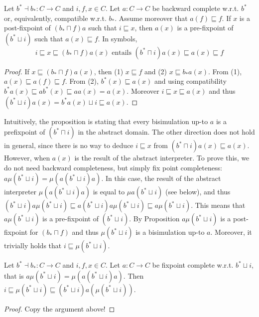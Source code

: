 \documentclass{llncs}
\begin{document}
\begin{proposition}
Let $b^* \dashv b_* \colon C \to C$ and $i,f,x\in C$. Let $a\colon C\to C$ be backward complete w.r.t. $b^*$ or, equivalently, compatible w.r.t. $b_*$. Assume moreover that $a(f)\sqsubseteq f$. 
%
If $x$ is a post-fixpoint of $(b_*\sqcap f)a$ such that $i\sqsubseteq x$,
then $a(x)$ is a pre-fixpoint of $(b^*\sqcup i)$ such that $a(x)\sqsubseteq f$.
In symbols, 
\begin{equation}
i \sqsubseteq x \sqsubseteq (b_*\sqcap f)a(x)
\text{ entails }
(b^*\sqcap i)a(x)\sqsubseteq a(x)\sqsubseteq f
\end{equation}

\end{proposition}
%
\begin{proof}
%
If $x\sqsubseteq (b_*\sqcap f)a(x)$, then (1) $x\sqsubseteq f$ and (2) $x\sqsubseteq b_*a(x)$. From (1), $a(x)\sqsubseteq a(f)\sqsubseteq f$. From (2), $b^*(x)\sqsubseteq a(x)$ and using compatibility $b^*a(x)\sqsubseteq ab^*(x)\sqsubseteq aa(x) = a(x)$. Moreover $i\sqsubseteq x\sqsubseteq a(x)$ and thus $(b^*\sqcup i)a(x)  = b^*a(x) \sqcup i \sqsubseteq a(x)$.
\end{proof}

Intuitively, the proposition is stating that every bisimulation up-to $a$ is a prefixpoint of $(b^*\sqcap i)$ in the abstract domain.
The other direction does not hold in general, since there is no way to deduce $i\sqsubseteq x$ from $(b^*\sqcap i)a(x)\sqsubseteq a(x)$.
However, when $a(x)$ is the result of the abstract interpreter. To prove this, we do not need backward completeness, but simply fix point completeness: $a\mu (b^*\sqcup i) = \mu(a(b^*\sqcup i)a)$. In this case, the result of the abstract interpreter $\mu(a(b^*\sqcup i)a)$ is equal to 
$\mu a(b^*\sqcup i)$ (see below), and thus $(b^*\sqcup i)a\mu (b^*\sqcup i) \sqsubseteq a(b^*\sqcup i)a\mu (b^*\sqcup i) \sqsubseteq a\mu (b^*\sqcup i)$. This means that $a\mu (b^*\sqcup i)$ is a pre-fixpoint of $(b^*\sqcup i)$. By Proposition \label{prop:correspondencefixedpoints}
 $a\mu (b^*\sqcup i)$ is a post-fixpoint for  $(b_*\sqcap f)$ and thus $\mu (b^*\sqcup i)$ is a bisimulation up-to $a$. Moreover, it trivially holds that $i\sqsubseteq \mu (b^*\sqcup i)$.
 
\begin{proposition}
Let $b^* \dashv b_* \colon C \to C$ and $i,f,x\in C$. Let $a\colon C\to C$ be fixpoint complete w.r.t. $b^*\sqcup i$, that is $a\mu (b^*\sqcup i) = \mu(a(b^*\sqcup i)a)$. Then $i\sqsubseteq \mu(b^*\sqcup i) \sqsubseteq (b^*\sqcup i) a(\mu(b^*\sqcup i))$. 
%
\end{proposition}
\begin{proof}
Copy the argument above!
\end{proof}
\end{document}
